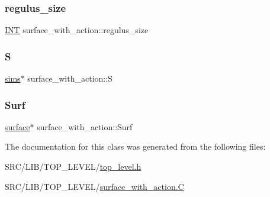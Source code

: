 \mbox{\label{classsurface__with__action_a3144f026aaf3cda6976ee6a0f6922481}} 
\subsubsection{\texorpdfstring{regulus\+\_\+size}{regulus\_size}}
{\footnotesize\ttfamily \mbox{\hyperlink{galois_8h_a09fddde158a3a20bd2dcadb609de11dc}{I\+NT}} surface\+\_\+with\+\_\+action\+::regulus\+\_\+size}

\mbox{\label{classsurface__with__action_aae9cc463b8b45bc730b746d2418c00a4}} 
\subsubsection{\texorpdfstring{S}{S}}
{\footnotesize\ttfamily \mbox{\hyperlink{classsims}{sims}}$\ast$ surface\+\_\+with\+\_\+action\+::S}

\mbox{\label{classsurface__with__action_a28f1189bfbd4aeca4a38ea6e8dffdecc}} 
\subsubsection{\texorpdfstring{Surf}{Surf}}
{\footnotesize\ttfamily \mbox{\hyperlink{classsurface}{surface}}$\ast$ surface\+\_\+with\+\_\+action\+::\+Surf}



The documentation for this class was generated from the following files\+:\begin{DoxyCompactItemize}
\item 
S\+R\+C/\+L\+I\+B/\+T\+O\+P\+\_\+\+L\+E\+V\+E\+L/\mbox{\hyperlink{top__level_8h}{top\+\_\+level.\+h}}\item 
S\+R\+C/\+L\+I\+B/\+T\+O\+P\+\_\+\+L\+E\+V\+E\+L/\mbox{\hyperlink{surface__with__action_8_c}{surface\+\_\+with\+\_\+action.\+C}}\end{DoxyCompactItemize}
